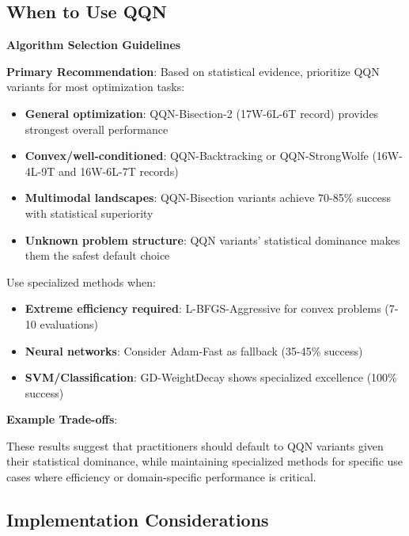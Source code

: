 \hypertarget{when-to-use-qqn}{%
\subsection{When to Use QQN}\label{when-to-use-qqn}}

\textbf{Algorithm Selection Guidelines}

\textbf{Primary Recommendation}: Based on statistical evidence, prioritize QQN variants for most optimization tasks:

\begin{itemize}
\tightlist
\item
  \textbf{General optimization}: QQN-Bisection-2 (17W-6L-6T record) provides strongest overall performance
\item
  \textbf{Convex/well-conditioned}: QQN-Backtracking or QQN-StrongWolfe (16W-4L-9T and 16W-6L-7T records)
\item
  \textbf{Multimodal landscapes}: QQN-Bisection variants achieve 70-85\% success with statistical superiority
\item
  \textbf{Unknown problem structure}: QQN variants' statistical dominance makes them the safest default choice
\end{itemize}

Use specialized methods when:

\begin{itemize}
\tightlist
\item
  \textbf{Extreme efficiency required}: L-BFGS-Aggressive for convex problems (7-10 evaluations)
\item
  \textbf{Neural networks}: Consider Adam-Fast as fallback (35-45\% success)
\item
  \textbf{SVM/Classification}: GD-WeightDecay shows specialized excellence (100\% success)
\end{itemize}

\textbf{Example Trade-offs}:

These results suggest that practitioners should default to QQN variants given their statistical dominance, while maintaining specialized methods for specific use cases where efficiency or domain-specific performance is critical.

\hypertarget{implementation-considerations}{%
\subsection{Implementation Considerations}\label{implementation-considerations}}

